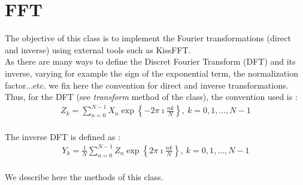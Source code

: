 

\newpage
{}
\section{FFT}

The objective of this class is to implement the Fourier transformations (direct and inverse) using external tools such as KissFFT. \\

As there are many ways to define the Discret Fourier Transform (DFT) and its inverse, varying for example the sign of the exponential term, the normalization factor...etc.
we fix here the convention for direct and inverse transformations. Thus, for the DFT (see \textit{transform} method of the class), the convention used is : \\
\begin{align*}
Z_{k} = \sum_{n=0}^{N-1} X_{n} \exp\left\{ -2 \pi \imath \frac{nk}{N} \right\},\ k=0,1,\ldots,N-1
\end{align*} \\

The inverse DFT is defined as :\\
\begin{align*}
Y_{k} = \frac{1}{N} \sum_{n=0}^{N-1} Z_{n} \exp\left\{2 \pi \imath \frac{nk}{N} \right\},\ k=0,1,\ldots,N-1
\end{align*} \\


We describe here the methods of this class. \\

